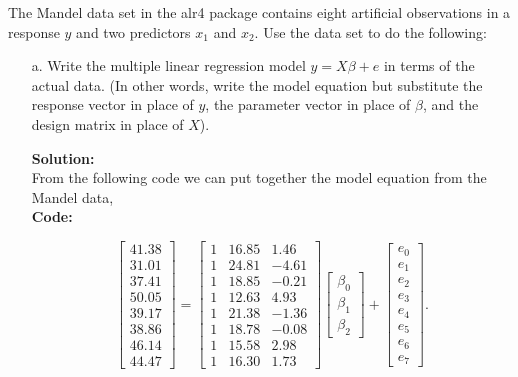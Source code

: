 \documentclass[12pt]{article}
\makeatletter
\theoremstyle{homework}
\newenvironment{exercise}[1]
{\def\@currentlabel{#1}\exercisecore}
{\endexercisecore}
\newcommand{\localhead}[1]{\par\smallskip\noindent\textbf{#1}\nobreak\\}%
\newcommand\solution{\localhead{Solution:}}
\makeatother
\begin{document}
\begin{exercise}{1} The Mandel data set in the alr4 package contains eight artificial observations in 
  a response $y$ and two predictors $x_1$ and $x_2$. Use the data set to do the following: 
  \begin{enumerate}
    \item[a.] Write the multiple linear regression model $y = X \beta + e$ in terms of the actual data. 
    (In other words, write the model equation but substitute the response vector in place of $y$, the parameter vector 
    in place of $\beta$, and the design matrix in place of $X$).\\
    \solution From the following code we can put together the model equation from the Mandel data, \\
     \textbf{Code:}
     \begin{center}
     
     \end{center} 
     \begin{equation*}
       \begin{bmatrix}
        41.38\\ 31.01\\ 37.41\\ 50.05\\ 39.17\\ 38.86\\ 46.14\\ 44.47
       \end{bmatrix}
       = 
       \begin{bmatrix}
           1& 16.85 & 1.46\\
           1& 24.81 &-4.61\\
           1& 18.85 &-0.21\\
           1& 12.63 & 4.93\\
           1& 21.38 &-1.36\\
           1& 18.78 &-0.08\\
           1& 15.58 & 2.98\\
           1& 16.30 & 1.73
       \end{bmatrix}
       \begin{bmatrix}
         \beta_0 \\ 
         \beta_1 \\ 
         \beta_2
       \end{bmatrix}
       +
       \begin{bmatrix}
       e_0 \\ e_1\\ e_2\\ e_3\\ e_4\\ e_5\\ e_6\\ e_7
       \end{bmatrix}.
     \end{equation*}
     \newpage


\end{enumerate}
\end{exercise}
\end{document}
